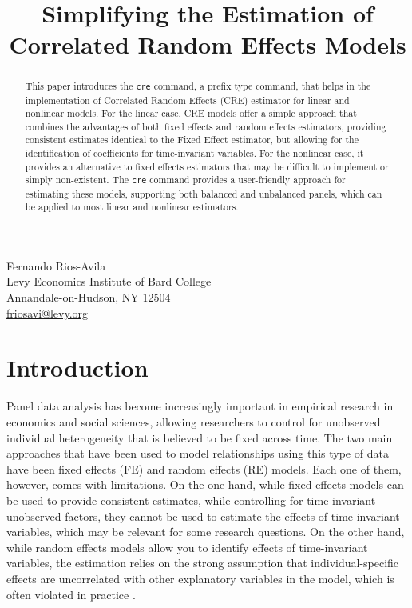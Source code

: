 \documentclass[bib]{statapress}
\begin{document}


 
\title[]{Simplifying the Estimation of Correlated Random Effects Models}


\makeatletter

\author{}{
Fernando Rios-Avila\\
Levy Economics Institute of Bard College\\Annandale-on-Hudson, NY
12504\\
\href{mailto:friosavi@levy.org}{friosavi@levy.org}
}
 
 
 

\maketitle

\begin{abstract}

This paper introduces the \texttt{cre} command, a prefix type command,
that helps in the implementation of Correlated Random Effects (CRE)
estimator for linear and nonlinear models. For the linear case, CRE
models offer a simple approach that combines the advantages of both
fixed effects and random effects estimators, providing consistent
estimates identical to the Fixed Effect estimator, but allowing for the
identification of coefficients for time-invariant variables. For the
nonlinear case, it provides an alternative to fixed effects estimators
that may be difficult to implement or simply non-existent. The
\texttt{cre} command provides a user-friendly approach for estimating
these models, supporting both balanced and unbalanced panels, which can
be applied to most linear and nonlinear estimators.

\end{abstract}

\section{Introduction}\label{introduction}

Panel data analysis has become increasingly important in empirical
research in economics and social sciences, allowing researchers to
control for unobserved individual heterogeneity that is believed to be
fixed across time. The two main approaches that have been used to model
relationships using this type of data have been fixed effects (FE) and
random effects (RE) models. Each one of them, however, comes with
limitations. On the one hand, while fixed effects models can be used to
provide consistent estimates, while controlling for time-invariant
unobserved factors, they cannot be used to estimate the effects of
time-invariant variables, which may be relevant for some research
questions. On the other hand, while random effects models allow you to
identify effects of time-invariant variables, the estimation relies on
the strong assumption that individual-specific effects are uncorrelated
with other explanatory variables in the model, which is often violated
in practice \citep{wooldridge2019}.
\end{document}
